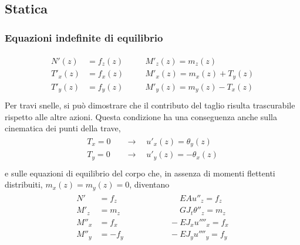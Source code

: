 \documentclass[letterpaper,10pt,italian]{jupyterBook}
\begin{document}
\subsection{Statica}
\label{\detokenize{ch/continuum/solids:statica}}\label{\detokenize{ch/continuum/solids:contiuum-solids-beam-statics}}

\subsubsection{Equazioni indefinite di equilibrio}
\label{\detokenize{ch/continuum/solids:equazioni-indefinite-di-equilibrio}}\label{\detokenize{ch/continuum/solids:contiuum-solids-beam-statics-equil}}\begin{equation*}
\begin{split}\begin{aligned}
  N'  (z) & = f_z(z) && \quad M'_z(z) = m_z(z) \\
  T'_x(z) & = f_x(z) && \quad M'_x(z) = m_x(z) + T_y(z) \\
  T'_y(z) & = f_y(z) && \quad M'_y(z) = m_y(z) - T_x(z) \\
\end{aligned}\end{split}
\end{equation*}
\sphinxAtStartPar
{} Per travi snelle, si può dimostrare che il contributo del taglio risulta trascurabile rispetto alle altre azioni. Questa condizione ha una conseguenza anche sulla cinematica dei punti della trave,
\begin{equation*}
\begin{split}\begin{aligned}
  T_x = 0 \quad & \rightarrow \quad u'_x(z) = \theta_y(z) \\
  T_y = 0 \quad & \rightarrow \quad u'_y(z) =-\theta_x(z) \\
\end{aligned}\end{split}
\end{equation*}
\sphinxAtStartPar
e sulle equazioni di equilibrio del corpo che, in assenza di momenti flettenti distribuiti, \(m_x(z) = m_y(z) = 0\), diventano
\begin{equation*}
\begin{split}\begin{aligned}
  N'    & = f_z  \qquad && \qquad \ \quad EA u''_z        = f_z \\
  M'_z  & = m_z  \qquad && \qquad \ \quad GJ_t \theta''_z = m_z \\
  M''_x & = f_x  \qquad && \qquad -EJ_x u''''_x           = f_x \\     
  M''_y & =-f_y  \qquad && \qquad -EJ_y u''''_y           = f_y \\     
\end{aligned}\end{split}
\end{equation*}
\end{document}
